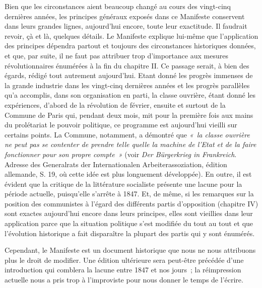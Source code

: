\documentclass[french,twoside]{book} %
\newcommand{\byline}[1]{\bigskip{\RaggedLeft{#1}\par}\bigskip}
\begin{document}
Bien que les circonstances aient beaucoup changé au cours des vingt-cinq dernières années, les principes généraux exposés dans ce Manifeste conservent dans leurs grandes lignes, aujourd’hui encore, toute leur exactitude. Il faudrait revoir, çà et là, quelques détails. Le Manifeste explique lui-même que l’application des principes dépendra partout et toujours des circonstances historiques données, et que, par suite, il ne faut pas attribuer trop d’importance aux mesures révolutionnaires énumérées à la fin du chapitre II. Ce passage serait, à bien des égards, rédigé tout autrement aujourd’hui. Etant donné les progrès immenses de la grande industrie dans les vingt-cinq dernières années et les progrès parallèles qu’a accomplis, dans son organisation en parti, la classe ouvrière, étant donné les expériences, d’abord de la révolution de février, ensuite et surtout de la Commune de Paris qui, pendant deux mois, mit pour la première fois aux mains du prolétariat le pouvoir politique, ce programme est aujourd’hui vieilli sur certains points. La Commune, notamment, a démontré que \emph{« la classe ouvrière ne peut pas se contenter de prendre telle quelle la machine de l’Etat et de la faire fonctionner pour son propre compte »} (voir \emph{Der Bürgerkrieg in Frankreich}. Adresse des Generalrats der Internationalen Arbeiterassoziation, édition allemande, S. 19, où cette idée est plus longuement développée). En outre, il est évident que la critique de la littérature socialiste présente une lacune pour la période actuelle, puisqu’elle s’arrête à 1847. Et, de même, si les remarques sur la position des communistes à l’égard des différents partis d’opposition (chapitre IV) sont exactes aujourd’hui encore dans leurs principes, elles sont vieillies dans leur application parce que la situation politique s’est modifiée du tout au tout et que l’évolution historique a fait disparaître la plupart des partis qui y sont énumérés.\par
Cependant, le Manifeste est un document historique que nous ne nous attribuons plus le droit de modifier. Une édition ultérieure sera peut-être précédée d’une introduction qui comblera la lacune entre 1847 et nos jours ; la réimpression actuelle nous a pris trop à l’improviste pour nous donner le temps de l’écrire.\par

\byline{Karl Marx, Friedrich Engels ; \\
Londres, 24 juin 1872}
\end{document}
